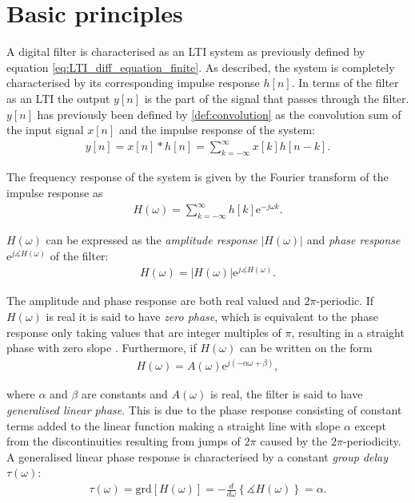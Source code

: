 \section{Basic principles} \label{sec:basic_filter}
A digital filter is characterised as an LTI system as previously defined by equation \eqref{eq:LTI_diff_equation_finite}. As described, the system is completely characterised by its corresponding impulse response $h[n]$. In terms of the filter as an LTI the output $y[n]$ is the part of the signal that passes through the filter. \\
$y[n]$ has previously been defined by \eqref{def:convolution} as the convolution sum of the input signal $x[n]$ and the impulse response of the system:
\begin{align*}
y[n] = x[n]*h[n] = \sum_{k=-\infty}^{\infty} x[k]h[n-k].
\end{align*}

The frequency response of the system is given by the Fourier transform of the impulse response as
\begin{align} \label{eq:freq_res}
H(\omega) = \sum_{k=-\infty}^{\infty} h[k] \text{e}^{-j\omega k}.
\end{align}

$H(\omega)$ can be expressed as the \textit{amplitude response} $|H(\omega)|$ and \textit{phase response} $\text{e}^{j\measuredangle H(\omega)}$ of the filter:
\begin{align*}
H(\omega) = |H(\omega)| \text{e}^{j\measuredangle H(\omega)}.
\end{align*}

The amplitude and phase response are both real valued and $2\pi$-periodic. If $H(\omega)$ is real it is said to have \textit{zero phase}, which is equivalent to the phase response only taking values that are integer multiples of $\pi$, resulting in a straight phase with zero slope \cite{page 227, FSP}. Furthermore, if $H(\omega)$ can be written on the form
\begin{align} \label{eq:lin_pha}
H(\omega) = A(\omega) \text{e}^{j(-\alpha\omega + \beta)},
\end{align}

where $\alpha$ and $\beta$ are constants and $A(\omega)$ is real, the filter is said to have \textit{generalised linear phase}. This is due to the phase response consisting of constant terms added to the linear function making a straight line with slope $\alpha$ except from the discontinuities resulting from jumps of $2\pi$ caused by the $2\pi$-periodicity. \\
A generalised linear phase response is characterised by a constant \textit{group delay} $\tau(\omega)$:
\begin{align*}
\tau(\omega) = \text{grd}[H(\omega)] = -\frac{d}{d\omega} \left\{ \measuredangle H(\omega) \right\} = \alpha.
\end{align*}

